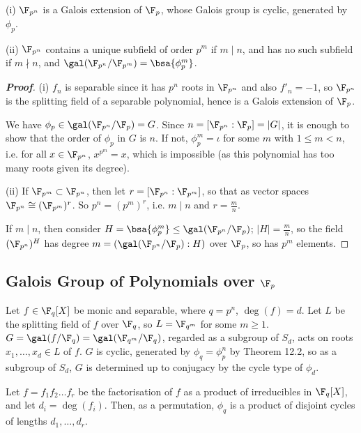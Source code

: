 \begin{theorem}
\ben
\item [(i)] $\F_{p^n}$ is a Galois extension of $\F_p$, whose Galois group is cyclic, generated by $\phi_p$.
\item [(ii)] $\F_{p^n}$ contains a unique subfield of order $p^m$ if $m \mid n$, and has no such subfield if $m \nmid n$, and $\gal(\F_{p^n}/\F_{p^m}) = \bsa{\phi^m_p}$.
\een
\end{theorem}

\begin{proof}[\bf Proof]
\ben
\item [(i)] $f_n$ is separable since it has $p^n$ roots in $\F_{p^n}$ and also $f'_n = -1$, so $\F_{p^n}$ is the splitting field of a separable polynomial, hence is a Galois extension of $\F_p$.

We have $\phi_p \in \gal(\F_{p^n}/\F_p) = G$. Since $n = [\F_{p^n} : \F_p] = |G|$, it is enough to show that the order of $\phi_p$ in $G$ is $n$. If not, $\phi^m_p = \iota$ for some $m$ with $1 \leq  m < n$, i.e. for all $x \in \F_{p^n}$, $x^{p^m} = x$, which is impossible (as this polynomial has too many roots given its degree).

\item [(ii)] If $\F_{p^m} \subset \F_{p^n}$, then let $r = [\F_{p^n} : \F_{p^m}]$, so that as vector spaces $\F_{p^n} \cong (\F_{p^m})^r$. So $p^n = (p^m)^r$, i.e. $m \mid n$ and $r = \frac mn$.

If $m \mid n$, then consider $H = \bsa{\phi^m_p} \leq  \gal(\F_{p^n}/\F_p)$; $|H| = \frac mn$, so the field $(\F_{p^n})^H$ has degree $m = (\gal(\F_{p^n}/\F_p) : H)$ over $\F_p$, so has $p^m$ elements.
\een
\end{proof}

\subsection{Galois Group of Polynomials over $\F_p$}

Let $f \in \F_q[X]$ be monic and separable, where $q = p^n$, $\deg(f) = d$. Let $L$ be the splitting field of $f$ over $\F_q$, so $L = \F_{q^m}$ for some $m \geq 1$. $G = \gal(f/\F_q) = \gal(\F_{q^m}/\F_q)$, regarded as a subgroup of $S_d$, acts on roots $x_1, \dots , x_d \in L$ of $f$. $G$ is cyclic, generated by $\phi_q = \phi^n_p$ by Theorem 12.2, so as a subgroup of $S_d$, $G$ is determined up to conjugacy by the cycle type of $\phi_d$.

\begin{proposition}
Let $f = f_1f_2 \dots f_r$ be the factorisation of $f$ as a product of irreducibles in $\F_q[X]$, and let $d_i = \deg(f_i)$. Then, as a permutation, $\phi_q$ is a product of disjoint cycles of lengths $d_1, \dots , d_r$.
\end{proposition}

